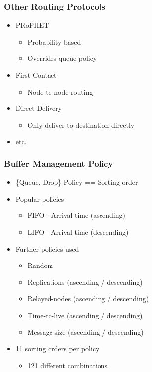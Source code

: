 \begin{frame}
  \frametitle{Other Routing Protocols}  
  \begin{itemize}
	\item PRoPHET
    \begin{itemize}
      	\item Probability-based
      	\item Overrides queue policy
    \end{itemize}
    \vspace{0.3cm}
    \item First Contact
	\begin{itemize}
      	\item Node-to-node routing
    \end{itemize}
    \vspace{0.3cm}
    \item Direct Delivery
	\begin{itemize}
      	\item Only deliver to destination directly
    \end{itemize}
    \vspace{0.3cm}
    \item etc.
    \vspace{0.3cm}    
  \end{itemize}
\end{frame}


\begin{frame}
  \frametitle{Buffer Management Policy}  
  \begin{itemize}
    \item \{Queue, Drop\} Policy == Sorting order
    \vspace{0.3cm}
    \item Popular policies
    \begin{itemize}
      \item FIFO - Arrival-time (ascending)
      \item LIFO - Arrival-time (descending)    
    \end{itemize}    
    \vspace{0.3cm}
    \item Further policies used
    \begin{itemize}
      \item Random
      \item Replications (ascending / descending)
      \item Relayed-nodes (ascending / descending)
      \item Time-to-live (ascending / descending)
      \item Message-size (ascending / descending)
    \end{itemize}
    \vspace{0.3cm}
    \item 11 sorting orders per policy
    \begin{itemize}
      \item 121 different combinations
    \end{itemize}
  \end{itemize}    
\end{frame}

